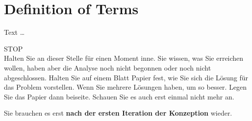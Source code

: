 \documentclass[11pt,a4paper,english]{scrreprt}
\newenvironment{comment}
  {\par\medskip
   \begingroup\color{olive}%
   }
 {\endgroup
  \medskip}
\begin{document}
\section{Definition of Terms}
Text \dots

\clearpage
\begin{comment}
\begin{center}
\huge
STOP\\
\normalsize
Halten Sie an dieser Stelle für einen Moment inne. Sie wissen, was Sie erreichen wollen, haben aber die Analyse noch nicht begonnen oder noch nicht abgeschlossen. Halten Sie auf einem Blatt Papier fest, wie Sie sich die Lösung für das Problem vorstellen. Wenn Sie mehrere Lösungen haben, um so besser. Legen Sie das Papier dann beiseite. Schauen Sie es auch erst einmal nicht mehr an.

Sie brauchen es erst \textbf{nach der ersten Iteration der Konzeption} wieder.
\end{center}
\end{comment}

\newpage
\end{document}
